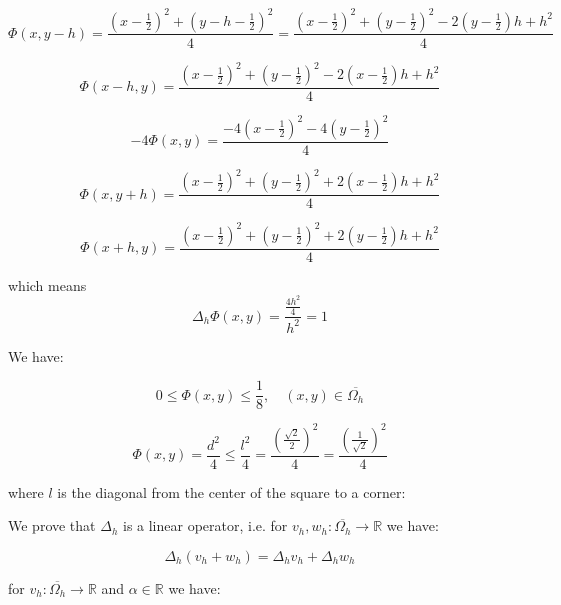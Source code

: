\begin{equation*}
\Phi(x, y - h) = \frac{(x - \frac{1}{2})^2 + (y - h - \frac{1}{2})^2}{4} = \frac{(x - \frac{1}{2})^2 + (y - \frac{1}{2})^2 - 2(y - \frac{1}{2})h + h^2}{4}
\end{equation*}

\begin{equation*}
\Phi(x - h, y) = \frac{(x - \frac{1}{2})^2 + (y - \frac{1}{2})^2 - 2(x - \frac{1}{2})h + h^2}{4}
\end{equation*}

\begin{equation*}
-4 \Phi(x, y) = \frac{-4(x - \frac{1}{2})^2 - 4(y - \frac{1}{2})^2}{4}
\end{equation*}

\begin{equation*}
\Phi(x, y + h) = \frac{(x - \frac{1}{2})^2 + (y - \frac{1}{2})^2 + 2(x - \frac{1}{2})h + h^2}{4}
\end{equation*}

\begin{equation*}
\Phi(x + h, y) = \frac{(x - \frac{1}{2})^2 + (y - \frac{1}{2})^2 + 2(y - \frac{1}{2})h + h^2}{4}
\end{equation*}

which means
\begin{equation*}
\Delta_h \Phi(x, y) = \frac{\frac{4 h^2}{4}}{h^2} = 1
\end{equation*}

We have:

\begin{equation*}
0 \le \Phi(x,y) \le \frac{1}{8}, \quad (x, y) \in \overline{\Omega_h}
\end{equation*}

\begin{equation*}
\Phi(x, y) = \frac{d^2}{4} \le \frac{l^2}{4} = \frac{(\frac{\sqrt{2}}{2})^2}{4} = \frac{(\frac{1}{\sqrt{2}})^2}{4}
\end{equation*}

where $l$ is the diagonal from the center of the square to a corner:

We prove that $\Delta_h$ is a linear operator, i.e. for $v_h, w_h: \overline{\Omega_h} \rightarrow \mathbb{R}$ we have:

\begin{equation*}
\Delta_h(v_h + w_h) = \Delta_h v_h + \Delta_h w_h
\end{equation*}

for $v_h: \overline{\Omega_h} \rightarrow \mathbb{R}$ and $\alpha \in \mathbb{R}$ we have:

